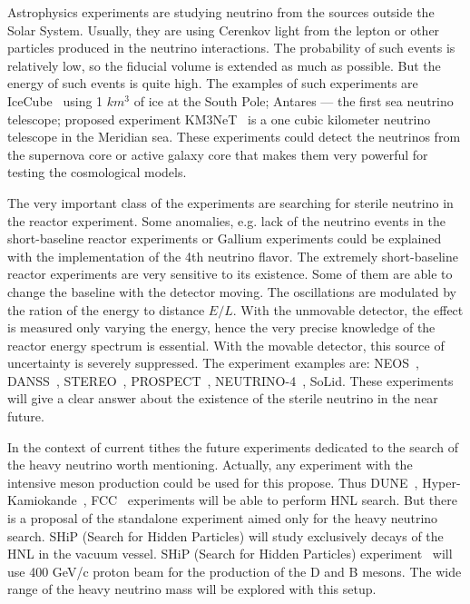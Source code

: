\documentclass[../main.tex]{subfiles}
\begin{document}
Astrophysics experiments are studying neutrino from the sources outside the Solar System. Usually, they are using Cerenkov light from the lepton or other particles produced in the neutrino interactions. The probability of such events is relatively low, so the fiducial volume is extended as much as possible. But the energy of such events is quite high. The examples of such experiments are IceCube~\cite{Aartsen2017} using 1 $km^3$ of ice at the South Pole; Antares --- the first sea neutrino telescope; proposed experiment KM3NeT~\cite{LeBreton2019} is a one cubic kilometer neutrino telescope in the Meridian sea. These experiments could detect the neutrinos from the supernova core or active galaxy core that makes them very powerful for testing the cosmological models.

The very important class of the experiments are searching for sterile neutrino in the reactor experiment. Some anomalies, e.g. lack of the neutrino events in the short-baseline reactor experiments or Gallium experiments could be explained with the implementation of the 4th neutrino flavor. The extremely short-baseline reactor experiments are very sensitive to its existence. Some of them are able to change the baseline with the detector moving. The oscillations are modulated by the ration of the energy to distance $E/L$. With the unmovable detector, the effect is measured only varying the energy, hence the very precise knowledge of the reactor energy spectrum is essential. With the movable detector, this source of uncertainty is severely suppressed. The experiment examples are: NEOS~\cite{Ko2017}, DANSS~\cite{Alekseev2018}, STEREO~\cite{Almazan2018}, PROSPECT~\cite{Ashenfelter2018}, NEUTRINO-4~\cite{Serebrov2015}, SoLid. These experiments will give a clear answer about the existence of the sterile neutrino in the near future.

In the context of current tithes the future experiments dedicated to the search of the heavy neutrino worth mentioning. Actually, any experiment with the intensive meson production could be used for this propose. Thus DUNE~\cite{Acciarri2016}, Hyper-Kamiokande~\cite{Proto-Collaboration2018}, FCC~\cite{Collaboration2019} experiments will be able to perform HNL search. But there is a proposal of the standalone experiment aimed only for the heavy neutrino search. SHiP (Search for Hidden Particles) will study exclusively decays of the HNL in the vacuum vessel. SHiP (Search for Hidden Particles) experiment~\cite{SHiPCollaboration2018a} will use 400 GeV/c proton beam for the production of the D and B mesons. The wide range of the heavy neutrino mass will be explored with this setup.
\end{document}
